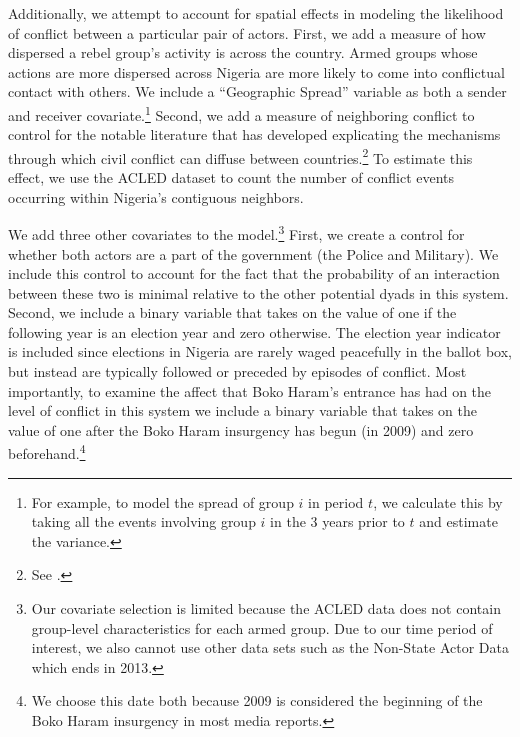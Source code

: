 Additionally, we attempt to account for spatial effects in modeling the likelihood of conflict between a particular pair of actors. First, we add a measure of how dispersed a rebel group's activity is across the country. Armed groups whose actions are more dispersed across Nigeria are more likely to come into conflictual contact with others. We include a ``Geographic Spread'' variable as both a sender and receiver covariate.\footnote{For example, to model the spread of group $i$ in period $t$, we calculate this by taking all the events involving group $i$ in the 3 years prior to $t$ and estimate the variance.}  Second, we add a measure of neighboring conflict to control for the notable literature that has developed explicating the mechanisms through which civil conflict can diffuse between countries.\footnote{See \citet{salehyan:gleditsch:2007,metternich:etal:2017, braithwaite:2010a, beardsley:2011}.} To estimate this effect, we use the ACLED dataset to count the number of conflict events occurring within Nigeria's contiguous neighbors. 

We add three other covariates to the model.\footnote{Our covariate selection is limited because the ACLED data does not contain group-level characteristics for each armed group. Due to our time period of interest, we also cannot use other data sets such as the Non-State Actor Data \citep{cunningham:etal:2009} which ends in 2013.} First, we create a control for whether both actors are a part of the government (the Police and Military). We include this control to account for the fact that the probability of an interaction between these two is minimal relative to the other potential dyads in this system. Second, we include a binary variable that takes on the value of one if the following year is an election year and zero otherwise. The election year indicator is included since elections in Nigeria are rarely waged peacefully in the ballot box, but instead are typically followed or preceded by episodes of conflict. Most importantly, to examine the affect that Boko Haram's entrance has had on the level of conflict in this system we include a binary variable that takes on the value of one after the Boko Haram insurgency has begun (in 2009) and zero beforehand.\footnote{We choose this date both because 2009 is considered the beginning of the Boko Haram insurgency in most media reports.}

